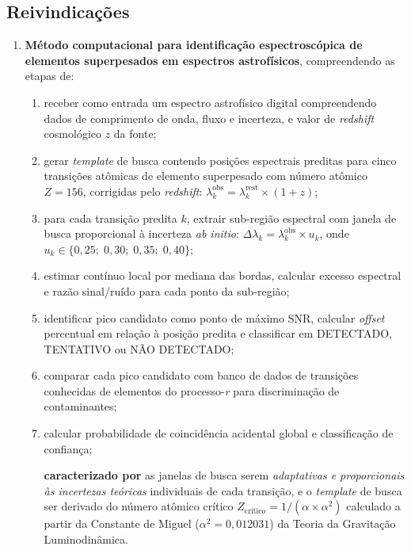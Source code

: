 \documentclass[12pt,a4paper]{article}
\newcommand{\alphaii}{\alpha^2}
\newcommand{\Zcrit}{Z_{\text{cr\'{i}tico}}}
\begin{document}
\subsection*{Reivindicações}

\begin{enumerate}

\item \textbf{Método computacional para identificação
espectroscópica de elementos superpesados em espectros
astrofísicos}, compreendendo as etapas de:
  \begin{enumerate}[label=(\alph*)]
  \item receber como entrada um espectro astrofísico digital
  compreendendo dados de comprimento de onda, fluxo e incerteza,
  e valor de \textit{redshift} cosmológico $z$ da fonte;
  \item gerar \textit{template} de busca contendo posições
  espectrais preditas para cinco transições atômicas de elemento
  superpesado com número atômico $Z = 156$, corrigidas pelo
  \textit{redshift}:
  $\lambda_k^{\text{obs}} = \lambda_k^{\text{rest}} \times (1+z)$;
  \item para cada transição predita $k$, extrair sub-região
  espectral com janela de busca proporcional à incerteza
  \textit{ab initio}: $\Delta\lambda_k = \lambda_k^{\text{obs}}
  \times u_k$, onde $u_k \in \{0{,}25;\; 0{,}30;\; 0{,}35;\;
  0{,}40\}$;
  \item estimar contínuo local por mediana das bordas, calcular
  excesso espectral e razão sinal/ruído para cada ponto da
  sub-região;
  \item identificar pico candidato como ponto de máximo SNR,
  calcular \textit{offset} percentual em relação à posição predita
  e classificar em DETECTADO, TENTATIVO ou NÃO DETECTADO;
  \item comparar cada pico candidato com banco de dados de
  transições conhecidas de elementos do processo-\textit{r} para
  discriminação de contaminantes;
  \item calcular probabilidade de coincidência acidental global
  e classificação de confiança;

  \textbf{caracterizado por} as janelas de busca serem
  \emph{adaptativas e proporcionais às incertezas teóricas}
  individuais de cada transição, e o \textit{template} de busca
  ser derivado do número atômico crítico $\Zcrit = 1/(\alpha \times
  \alphaii)$ calculado a partir da Constante de Miguel
  ($\alphaii = 0{,}012031$) da Teoria da Gravitação Luminodinâmica.
  \end{enumerate}


\end{enumerate}
\end{document}
